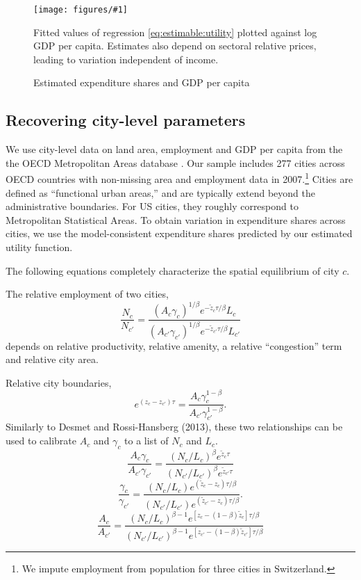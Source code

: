 \documentclass[12pt]{article}
\newcommand{\dofigure}[3]{\begin{figure}
\begin{centering}
\texttt{[image: figures/\#1]}
  \caption{#2\label{fig:#1}}
\end{centering}

\noindent \footnotesize{#3}
\end{figure}}
\begin{document}
\dofigure{city_level_inputs/expenditure_shares}{Estimated expenditure shares and GDP per capita}{Fitted values of regression \eqref{eq:estimable:utility} plotted against log GDP per capita. Estimates also depend on sectoral relative prices, leading to variation independent of income.}

\subsection{Recovering city-level parameters}
We use city-level data on land area, employment and GDP per capita from the the OECD Metropolitan Areas database \cite{oecd}. Our sample includes 277 cities across OECD countries with non-missing area and employment data in 2007.\footnote{We impute employment from population for three cities in Switzerland.} Cities are defined as ``functional urban areas,'' and are typically extend beyond the administrative boundaries. For US cities, they roughly correspond to Metropolitan Statistical Areas. To obtain variation in expenditure shares across cities, we use the model-consistent expenditure shares predicted by our estimated utility function. 

The following equations completely characterize the spatial equilibrium of city $c$.



The relative employment of two cities,
\[
\frac{N_c}{N_{c'}} 
= \frac
	 {\left(A_c\gamma_c\right)^{1/\beta} e^{-\tilde z_c{\tau/\beta}} L_{c}}
	 {\left(A_{c'}\gamma_{c'}\right)^{1/\beta} e^{-\tilde z_{c'}{\tau/\beta}} L_{c'}}
\]
depends on relative productivity, relative amenity, a relative ``congestion'' term and relative city area.

Relative city boundaries,
\[
e^{(z_{c}-z_{c'}) \tau} = 
\frac {A_c\gamma_c^{1-\beta}}
	{A_{c'}\gamma_{c'}^{1-\beta}}.
\]
Similarly to Desmet and Rossi-Hansberg (2013), these two relationships can be used to calibrate $A_c$ and $\gamma_c$ to a list of $N_c$ and $L_c$.
\[
\frac{A_c\gamma_c}{A_{c'}\gamma_{c'}} 
= \frac
	 {\left(N_c/L_c\right)^{\beta} e^{\tilde z_c{\tau}}}
	 {\left(N_{c'}/L_{c'}\right)^{\beta} e^{\tilde z_{c'}{\tau}}}
\]
\[
\frac {\gamma_c}
	{\gamma_{c'}} = 
\frac
	 {\left(N_c/L_c\right) e^{(\tilde z_c-z_{c}){\tau/\beta}}}
	 {\left(N_{c'}/L_{c'}\right) e^{(\tilde z_{c'}-z_{c}){\tau/\beta}}}.
\]
\[
\frac{A_c}{A_{c'}} 
= \frac
	 {\left(N_c/L_c\right)^{\beta-1} e^{[z_{c}-(1-\beta)\tilde z_c]{\tau/\beta}}}
	 {\left(N_{c'}/L_{c'}\right)^{\beta-1} e^{[z_{c'}-(1-\beta)\tilde z_{c'}]{\tau/\beta}}}
\]
\end{document}
